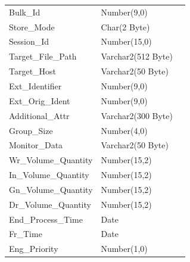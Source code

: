\documentclass[12pt,twoside]{article}
\begin{document}
\begin{longtable}{l|l|l}
Bulk\_Id & Number(9,0) & \\
Store\_Mode & Char(2 Byte) & \\
Session\_Id & Number(15,0) & \\
Target\_File\_Path & Varchar2(512 Byte) & \\
Target\_Host & Varchar2(50 Byte) & \\
Ext\_Identifier & Number(9,0) & \\
Ext\_Orig\_Ident & Number(9,0) & \\
Additional\_Attr & Varchar2(300 Byte) & \\
Group\_Size & Number(4,0) & \\
Monitor\_Data & Varchar2(50 Byte) & \\
Wr\_Volume\_Quantity & Number(15,2) & \\
In\_Volume\_Quantity & Number(15,2) & \\
Gn\_Volume\_Quantity & Number(15,2) & \\
Dr\_Volume\_Quantity & Number(15,2) & \\
End\_Process\_Time & Date & \\
Fr\_Time & Date & \\
Eng\_Priority & Number(1,0) & \\
\hline
\end{longtable}
\newpage 
\end{document}
